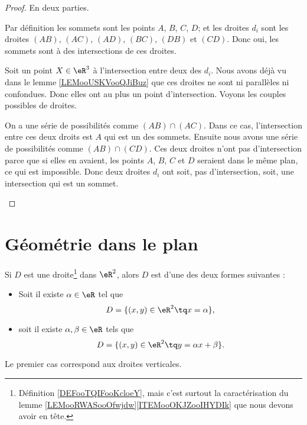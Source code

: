 \begin{proof}
	En deux parties.
	\begin{subproof}

		Par définition les sommets sont les points \( A \), \( B\), \( C\), \( D\); et les droites \( d_i\) sont les droites \( (AB)\), \( (AC)\), \( (AD)\), \( (BC)\), \( (DB)\) et \( (CD)\). Donc oui, les sommets sont à des intersections de ces droites.

		Soit un point \( X\in \eR^3\) à l'intersection entre deux des \( d_i\). Nous avons déjà vu dans le lemme \ref{LEMooUSKVooQJiBuz} que ces droites ne sont ni parallèles ni confondues. Donc elles ont au plus un point d'intersection. Voyons les couples possibles de droites.

		On a une série de possibilités comme \( (AB)\cap(AC)\). Dans ce cas, l'intersection entre ces deux droits est \( A\) qui est un des sommets. Ensuite nous avons une série de possibilités comme \( (AB)\cap (CD)\). Ces deux droites n'ont pas d'intersection parce que si elles en avaient, les points \( A\), \( B\), \( C\) et \( D\) seraient dans le même plan, ce qui est impossible.
		Donc deux droites \( d_i\) ont soit, pas d'intersection, soit, une intersection qui est un sommet.
	\end{subproof}
\end{proof}

\section{Géométrie dans le plan}

\begin{lemma}       \label{LEMooYIHXooEwmlPo}
	Si \( D\) est une droite\footnote{Définition \ref{DEFooTQIFooKcloeY}, mais c'est surtout la caractérisation du lemme \ref{LEMooRWASooOfwjdw}\ref{ITEMooOKJZooIHYDIk} que nous devons avoir en tête.} dans \( \eR^2\), alors \( D\) est d'une des deux formes suivantes :
	\begin{itemize}
		\item Soit il existe \( \alpha\in \eR\) tel que
		      \begin{equation}
			      D=\{ (x,y)\in \eR^2\tq x=\alpha \},
		      \end{equation}
		\item soit il existe \( \alpha,\beta\in \eR\) tels que
		      \begin{equation}
			      D=\{ (x,y)\in \eR^2\tq y=\alpha x+\beta \}.
		      \end{equation}
	\end{itemize}
	Le premier cas correspond aux droites verticales.
\end{lemma}

